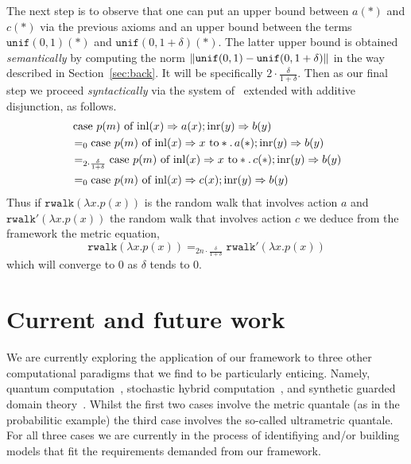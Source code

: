 \documentclass[a4paper,UKenglish,cleveref, autoref, thm-restate]{lipics-v2021}
\begin{document}
\begin{example}
        The next step is to observe that one can put an upper bound between
        $a(\ast)$ and $c(\ast)$ via the previous axioms and an upper bound
        between the terms $\mathtt{unif}(0,1)(\ast)$ and
        $\mathtt{unif}(0,1+\delta)(\ast)$. The latter upper bound is obtained
        \emph{semantically} by computing the norm $\left\lVert \mathtt{unif}(0,1) -
        \mathtt{unif}(0,1+\delta)  \right\rVert$ in the way described in
        Section~\ref{sec:back}. It will be specifically $2 \cdot
        {\frac{\delta}{1 + \delta}}$. Then as our final step we proceed
        \emph{syntactically} via the system
        of~\cite{dahlqvist22,dahlqvist2023syntactic} extended with additive
        disjunction, as follows.
        \begin{align*}
               &\, \text{case } p(m) \text{ of } \mathrm{inl}(x) \Rightarrow a(x) ; 
               \mathrm{inr}(y) \Rightarrow b(y)
               \\
               & =_0
               \text{case } p(m) \text{ of } \mathrm{inl}(x) \Rightarrow x \text{ to} 
               \ast. \, a(\ast) 
               ; 
               \mathrm{inr}(y) \Rightarrow b(y)
               \\
               & =_{2 \cdot {\frac{\delta}{1 + \delta}}}
               \text{case } p(m) \text{ of } \mathrm{inl}(x) \Rightarrow x \text{ to} 
               \ast. \, c(\ast) 
               ; 
               \mathrm{inr}(y) \Rightarrow b(y)
               \\
               & =_0
               \text{case } p(m) \text{ of } \mathrm{inl}(x) \Rightarrow c(x) 
               ; 
               \mathrm{inr}(y) \Rightarrow b(y)
        \end{align*}
        Thus if $\mathtt{rwalk}(\lambda x. p(x))$ is the random walk that
        involves action $a$ and $\mathtt{rwalk'}(\lambda x. p(x))$ the random
        walk that involves action $c$ we deduce from the framework the metric
        equation,
        \[
                \mathtt{rwalk}(\lambda x. p(x)) =_{2n \cdot \frac{\delta}{1 + \delta}}
                \mathtt{rwalk'}(\lambda x. p(x)) 
        \]
        which will converge to $0$ as $\delta$ tends to $0$.
\end{example}

\section{Current and future work}

We are currently exploring the application of our framework to three other
computational paradigms that we find to be particularly enticing.  Namely,
quantum computation~\cite{nielsen2010quantum}, stochastic hybrid
computation~\cite{neves20}, and synthetic guarded domain
theory~\cite{birkedal12}. Whilst the first two cases involve the metric
quantale (as in the probabilitic example) the third case involves the so-called
ultrametric quantale. For all three cases we are currently in the process of
identifiying and/or building models that fit the requirements demanded from our
framework.
\end{document}
